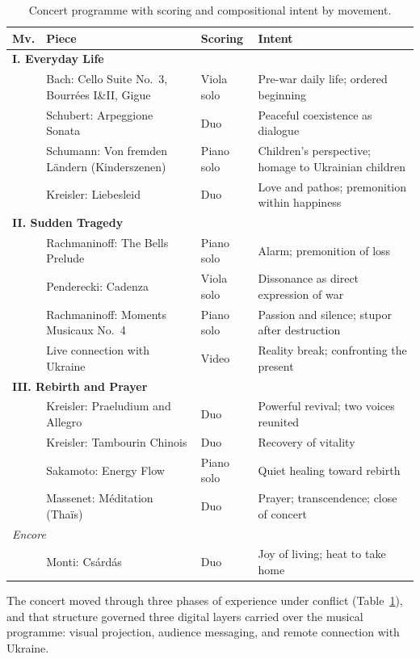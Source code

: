 \documentclass[sigconf,anonymous,review]{acmart}
\begin{document}
\begin{table}
\caption{Concert programme with scoring and compositional intent by movement.}
\label{tab:programme}
\small
\begin{tabular}{llp{5.5cm}p{5.5cm}}
\toprule
Mv. & Piece & Scoring & Intent \\
\midrule
\multicolumn{4}{l}{\textbf{I. Everyday Life}} \\
 & Bach: Cello Suite No.~3, Bourrées I\&II, Gigue & Viola solo & Pre-war daily life; ordered beginning \\
 & Schubert: Arpeggione Sonata & Duo & Peaceful coexistence as dialogue \\
 & Schumann: Von fremden Ländern (Kinderszenen) & Piano solo & Children's perspective; homage to Ukrainian children \\
 & Kreisler: Liebesleid & Duo & Love and pathos; premonition within happiness \\
\midrule
\multicolumn{4}{l}{\textbf{II. Sudden Tragedy}} \\
 & Rachmaninoff: The Bells Prelude & Piano solo & Alarm; premonition of loss \\
 & Penderecki: Cadenza & Viola solo & Dissonance as direct expression of war \\
 & Rachmaninoff: Moments Musicaux No.~4 & Piano solo & Passion and silence; stupor after destruction \\
 & Live connection with Ukraine & Video & Reality break; confronting the present \\
\midrule
\multicolumn{4}{l}{\textbf{III. Rebirth and Prayer}} \\
 & Kreisler: Praeludium and Allegro & Duo & Powerful revival; two voices reunited \\
 & Kreisler: Tambourin Chinois & Duo & Recovery of vitality \\
 & Sakamoto: Energy Flow & Piano solo & Quiet healing toward rebirth \\
 & Massenet: M\'{e}ditation (Tha\"{i}s) & Duo & Prayer; transcendence; close of concert \\
\midrule
\multicolumn{4}{l}{\textit{Encore}} \\
 & Monti: Cs\'{a}rd\'{a}s & Duo & Joy of living; heat to take home \\
\bottomrule
\end{tabular}
\end{table}

The concert moved through three phases of experience under conflict (Table~\ref{tab:programme}),
and that structure governed three digital layers carried over the musical programme:
visual projection, audience messaging, and remote connection with Ukraine.
\end{document}
